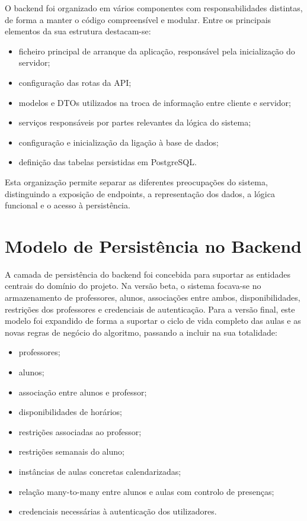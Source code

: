 O backend foi organizado em vários componentes com responsabilidades distintas, de forma a manter o código compreensível e modular.
Entre os principais elementos da sua estrutura destacam-se:
\begin{itemize}
    \item ficheiro principal de arranque da aplicação, responsável pela inicialização do servidor;
    \item configuração das rotas da API;
    \item modelos e DTOs utilizados na troca de informação entre cliente e servidor;
    \item serviços responsáveis por partes relevantes da lógica do sistema;
    \item configuração e inicialização da ligação à base de dados;
    \item definição das tabelas persistidas em PostgreSQL.
\end{itemize}

Esta organização permite separar as diferentes preocupações do sistema, distinguindo a exposição de endpoints, a representação dos dados,
a lógica funcional e o acesso à persistência.

\section{Modelo de Persistência no Backend}

A camada de persistência do backend foi concebida para suportar as entidades centrais do domínio do projeto. Na versão beta, o sistema focava-se no armazenamento de professores, alunos, associações entre ambos, disponibilidades, restrições dos professores e credenciais de autenticação. Para a versão final, este modelo foi expandido de forma a suportar o ciclo de vida completo das aulas e as novas regras de negócio do algoritmo, passando a incluir na sua totalidade:

\begin{itemize}
    \item professores;
    \item alunos;
    \item associação entre alunos e professor;
    \item disponibilidades de horários;
    \item restrições associadas ao professor;
    \item restrições semanais do aluno;
    \item instâncias de aulas concretas calendarizadas;
    \item relação many-to-many entre alunos e aulas com controlo de presenças;
    \item credenciais necessárias à autenticação dos utilizadores.
\end{itemize}


